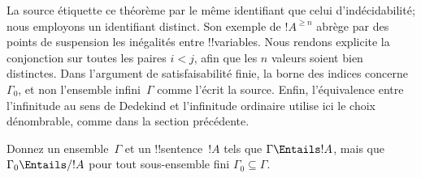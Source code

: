 \documentclass[../../../include/open-logic-section]{subfiles}
\begin{document}
\begin{editorial}
La source étiquette ce théorème par le même
identifiant que celui d'indécidabilité; nous
employons un identifiant distinct.
Son exemple de $!A^{\ge n}$ abrège par des
points de suspension les inégalités entre
!!{variable}s. Nous rendons explicite la
conjonction sur toutes les paires $i<j$, afin
que les $n$ valeurs soient bien distinctes.
Dans l'argument de
satisfaisabilité finie, la borne des indices
concerne $\Gamma_0$, et non l'ensemble
infini~$\Gamma$ comme l'écrit la source.
Enfin, l'équivalence entre l'infinitude au
sens de Dedekind et l'infinitude ordinaire
utilise ici le choix dénombrable, comme dans
la section précédente.
\end{editorial}

\begin{prob}
Donnez un ensemble~$\Gamma$ et un
!!{sentence}~$!A$ tels que
$\Gamma\Entails !A$, mais que
$\Gamma_0\Entails/ !A$ pour tout
sous-ensemble fini $\Gamma_0\subseteq\Gamma$.
\end{prob}
\end{document}
